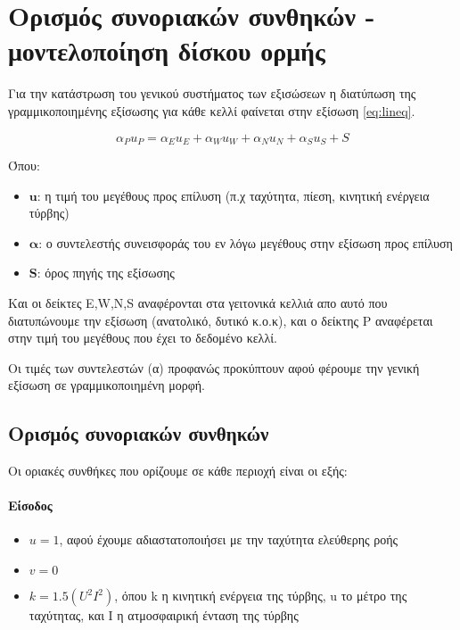 \section{Ορισμός συνοριακών συνθηκών - μοντελοποίηση δίσκου ορμής}

Για την κατάστρωση του γενικού συστήματος των εξισώσεων η διατύπωση της γραμμικοποιημένης εξίσωσης για κάθε κελλί φαίνεται στην εξίσωση \ref{eq:lineq}.

\begin{equation}
    \alpha_Pu_P=\alpha_Eu_E+\alpha_Wu_W+\alpha_Nu_N+\alpha_Su_S + S
    \label{eq:lineq}
\end{equation}

Όπου:
\begin{itemize}
    \item $\mathbf{u}$: η τιμή του μεγέθους προς επίλυση (π.χ ταχύτητα, πίεση, κινητική ενέργεια τύρβης)
    \item $\mathbf{\alpha}$: ο συντελεστής συνεισφοράς του εν λόγω μεγέθους στην εξίσωση προς επίλυση
    \item $\mathbf{S}$: όρος πηγής της εξίσωσης
\end{itemize}

Και οι δείκτες E,W,N,S αναφέρονται στα γειτονικά κελλιά απο αυτό που διατυπώνουμε την εξίσωση (ανατολικό, δυτικό κ.ο.κ), και ο δείκτης P αναφέρεται στην τιμή του μεγέθους που έχει το δεδομένο κελλί. 

Οι τιμές των συντελεστών (α) προφανώς προκύπτουν αφού φέρουμε την γενική εξίσωση σε γραμμικοποιημένη μορφή.

\subsection{Ορισμός συνοριακών συνθηκών}

Οι οριακές συνθήκες που ορίζουμε σε κάθε περιοχή είναι οι εξής:

\paragraph{Είσοδος}

\begin{itemize}
    \item $u=1$, αφού έχουμε αδιαστατοποιήσει με την ταχύτητα ελεύθερης ροής
    \item $v=0$
    \item $k=1.5(U^2I^2)$, όπου k η κινητική ενέργεια της τύρβης, u το μέτρο της ταχύτητας, και I η ατμοσφαιρική ένταση της τύρβης
\end{itemize}

